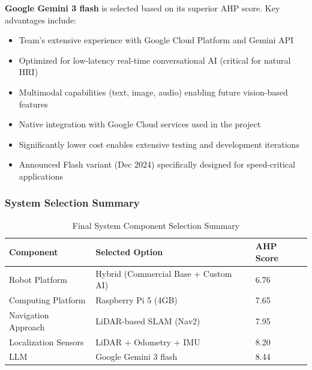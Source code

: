 \textbf{Google Gemini 3 flash} is selected based on its superior AHP score. Key advantages include:
\begin{itemize}
    \item Team's extensive experience with Google Cloud Platform and Gemini API
    \item Optimized for low-latency real-time conversational AI (critical for natural HRI)
    \item Multimodal capabilities (text, image, audio) enabling future vision-based features
    \item Native integration with Google Cloud services used in the project
    \item Significantly lower cost enables extensive testing and development iterations
    \item Announced Flash variant (Dec 2024) specifically designed for speed-critical applications
\end{itemize}

\subsubsection{System Selection Summary}
\begin{table}[H]
\centering
\caption{Final System Component Selection Summary}
\begin{tabular}{lll}
\toprule
\textbf{Component} & \textbf{Selected Option} & \textbf{AHP Score} \\
\midrule
Robot Platform & Hybrid (Commercial Base + Custom AI) & 6.76 \\
Computing Platform & Raspberry Pi 5 (4GB) & 7.65 \\
Navigation Approach & LiDAR-based SLAM (Nav2) & 7.95 \\
Localization Sensors & LiDAR + Odometry + IMU & 8.20 \\
LLM & Google Gemini 3 flash & 8.44 \\
\bottomrule
\end{tabular}
\end{table}

